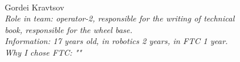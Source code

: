 \begin{figure}[H]
\begin{minipage}[h]{0.47\linewidth}
	\end{minipage}
	\vfill
	\begin{minipage}{0.47\linewidth}
		\\
	\end{minipage}
	\hfill
	\begin{minipage}{0.47\linewidth}
		Gordei Kravtsov\\
		\emph{Role in team: operator-2, responsible for the writing of technical book, responsible for the wheel base. \\}
		\emph{Information: 17 years old, in robotics 2 years, in FTC 1 year.\\} 
		\emph{Why I chose FTC: ""}				
	\end{minipage}
\end{figure}

